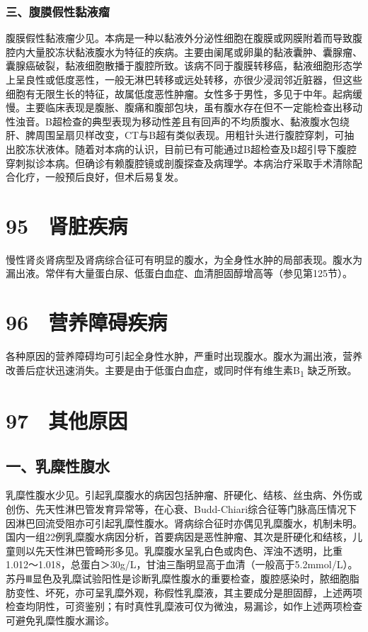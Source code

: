 \subsubsection{三、腹膜假性黏液瘤}

腹膜假性黏液瘤少见。本病是一种以黏液外分泌性细胞在腹膜或网膜附着而导致腹腔内大量胶冻状黏液腹水为特征的疾病。主要由阑尾或卵巢的黏液囊肿、囊腺瘤、囊腺癌破裂，黏液细胞散播于腹腔所致。该病不同于腹膜转移癌，黏液细胞形态学上呈良性或低度恶性，一般无淋巴转移或远处转移，亦很少浸润邻近脏器，但这些细胞有无限生长的特征，故属低度恶性肿瘤。女性多于男性，多见于中年。起病缓慢。主要临床表现是腹胀、腹痛和腹部包块，虽有腹水存在但不一定能检查出移动性浊音。B超检查的典型表现为移动性差且有回声的不均质腹水、黏液腹水包绕肝、脾周围呈扇贝样改变，CT与B超有类似表现。用粗针头进行腹腔穿刺，可抽出胶冻状液体。随着对本病的认识，目前已有可能通过B超检查及B超引导下腹腔穿刺拟诊本病。但确诊有赖腹腔镜或剖腹探查及病理学。本病治疗采取手术清除配合化疗，一般预后良好，但术后易复发。

\protect\hypertarget{text00224.html}{}{}

\section{95　肾脏疾病}

慢性肾炎肾病型及肾病综合征可有明显的腹水，为全身性水肿的局部表现。腹水为漏出液。常伴有大量蛋白尿、低蛋白血症、血清胆固醇增高等（参见第125节）。

\protect\hypertarget{text00225.html}{}{}

\section{96　营养障碍疾病}

各种原因的营养障碍均可引起全身性水肿，严重时出现腹水。腹水为漏出液，营养改善后症状迅速消失。主要是由于低蛋白血症，或同时伴有维生素B\textsubscript{1}
缺乏所致。

\protect\hypertarget{text00226.html}{}{}

\section{97　其他原因}

\subsection{一、乳糜性腹水}

乳糜性腹水少见。引起乳糜腹水的病因包括肿瘤、肝硬化、结核、丝虫病、外伤或创伤、先天性淋巴管发育异常等，在心衰、Budd-Chiari综合征等门脉高压情况下因淋巴回流受阻亦可引起乳糜性腹水。肾病综合征时亦偶见乳糜腹水，机制未明。国内一组22例乳糜腹水病因分析，首要病因是恶性肿瘤、其次是肝硬化和结核，儿童则以先天性淋巴管畸形多见。乳糜腹水呈乳白色或肉色、浑浊不透明，比重1.012～1.018，总蛋白＞30g/L，甘油三酯明显高于血清（一般高于5.2mmol/L）。苏丹Ⅲ显色及乳糜试验阳性是诊断乳糜性腹水的重要检查，腹腔感染时，脓细胞脂肪变性、坏死，亦可呈乳糜外观，称假性乳糜液，其主要成分是胆固醇，上述两项检查均阴性，可资鉴别；有时真性乳糜液可仅为微浊，易漏诊，如作上述两项检查可避免乳糜性腹水漏诊。

